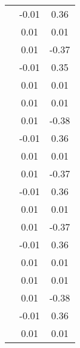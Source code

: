 \begin{table}
\begin{tabular}{c|cc|}
\multicolumn{1}{|c|}{} & \multicolumn{1}{|c|}{     -0.01} & \multicolumn{1}{|c|}{      0.36} \\ 
\multicolumn{1}{|c|}{} & \multicolumn{1}{|c|}{      0.01} & \multicolumn{1}{|c|}{      0.01} \\ 
\multicolumn{1}{|c|}{} & \multicolumn{1}{|c|}{      0.01} & \multicolumn{1}{|c|}{     -0.37} \\ 
\multicolumn{1}{|c|}{} & \multicolumn{1}{|c|}{     -0.01} & \multicolumn{1}{|c|}{      0.35} \\ 
\multicolumn{1}{|c|}{} & \multicolumn{1}{|c|}{      0.01} & \multicolumn{1}{|c|}{      0.01} \\ 
\multicolumn{1}{|c|}{} & \multicolumn{1}{|c|}{      0.01} & \multicolumn{1}{|c|}{      0.01} \\ 
\multicolumn{1}{|c|}{} & \multicolumn{1}{|c|}{      0.01} & \multicolumn{1}{|c|}{     -0.38} \\ 
\multicolumn{1}{|c|}{} & \multicolumn{1}{|c|}{     -0.01} & \multicolumn{1}{|c|}{      0.36} \\ 
\multicolumn{1}{|c|}{} & \multicolumn{1}{|c|}{      0.01} & \multicolumn{1}{|c|}{      0.01} \\ 
\multicolumn{1}{|c|}{} & \multicolumn{1}{|c|}{      0.01} & \multicolumn{1}{|c|}{     -0.37} \\ 
\multicolumn{1}{|c|}{} & \multicolumn{1}{|c|}{     -0.01} & \multicolumn{1}{|c|}{      0.36} \\ 
\multicolumn{1}{|c|}{} & \multicolumn{1}{|c|}{      0.01} & \multicolumn{1}{|c|}{      0.01} \\ 
\multicolumn{1}{|c|}{} & \multicolumn{1}{|c|}{      0.01} & \multicolumn{1}{|c|}{     -0.37} \\ 
\multicolumn{1}{|c|}{} & \multicolumn{1}{|c|}{     -0.01} & \multicolumn{1}{|c|}{      0.36} \\ 
\multicolumn{1}{|c|}{} & \multicolumn{1}{|c|}{      0.01} & \multicolumn{1}{|c|}{      0.01} \\ 
\multicolumn{1}{|c|}{} & \multicolumn{1}{|c|}{      0.01} & \multicolumn{1}{|c|}{      0.01} \\ 
\multicolumn{1}{|c|}{} & \multicolumn{1}{|c|}{      0.01} & \multicolumn{1}{|c|}{     -0.38} \\ 
\multicolumn{1}{|c|}{} & \multicolumn{1}{|c|}{     -0.01} & \multicolumn{1}{|c|}{      0.36} \\ 
\multicolumn{1}{|c|}{} & \multicolumn{1}{|c|}{      0.01} & \multicolumn{1}{|c|}{      0.01} \\ 

\end{tabular}
\end{table}
